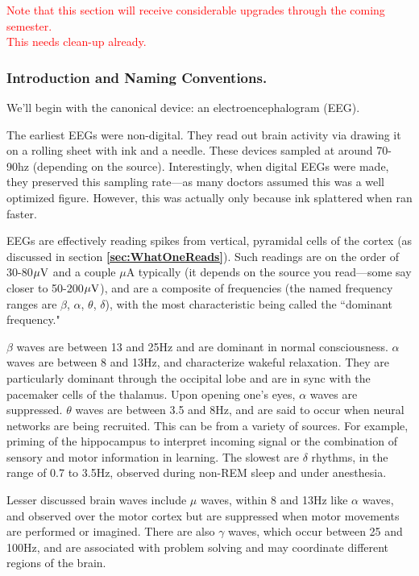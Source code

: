 \textcolor{red}{Note that this section will receive considerable upgrades through the coming semester.} \\

\textcolor{red}{This needs clean-up already.}

\subsubsection{Introduction and Naming Conventions.}

We'll begin with the canonical device: an electroencephalogram (EEG).\newline

The earliest EEGs were non-digital. They read out brain activity via drawing it on a rolling sheet with ink and a needle. These devices sampled at around 70-90hz (depending on the source). Interestingly, when digital EEGs were made, they preserved this sampling rate---as many doctors assumed this was a well optimized figure. However, this was actually only because ink splattered when ran faster.\newline

EEGs are effectively reading spikes from vertical, pyramidal cells of the cortex (as discussed in section \textbf{\ref{sec:WhatOneReads}}). Such readings are on the order of 30-80$\mu{\rm V}$ and a couple $\mu$A typically (it depends on the source you read---some say closer to 50-200$\mu{\rm V}$), and are a composite of frequencies (the named frequency ranges are $\beta$, $\alpha$, $\theta$, $\delta$), with the most characteristic being called the ``dominant frequency."\newline

$\beta$ waves are between 13 and 25Hz and are dominant in normal consciousness. $\alpha$ waves are between 8 and 13Hz, and characterize wakeful relaxation. They are particularly dominant through the occipital lobe and are in sync with the pacemaker cells of the thalamus. Upon opening one's eyes, $\alpha$ waves are suppressed. $\theta$ waves are between 3.5 and 8Hz, and are said to occur when neural networks are being recruited. This can be from a variety of sources. For example, priming of the hippocampus to interpret incoming signal or the combination of sensory and motor information in learning. The slowest are $\delta$ rhythms, in the range of 0.7 to 3.5Hz, observed during non-REM sleep and under anesthesia.\newline

Lesser discussed brain waves include $\mu$ waves, within 8 and 13Hz like $\alpha$ waves, and observed over the motor cortex but are suppressed when motor movements are performed or imagined. There are also $\gamma$ waves, which occur between 25 and 100Hz, and are associated with problem solving and may coordinate different regions of the brain.\newline

